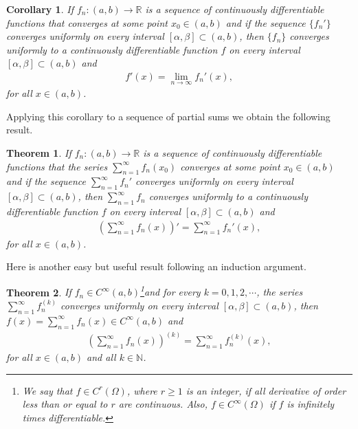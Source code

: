 \documentclass[10pt]{book}
\newtheorem{theorem}{Theorem}[chapter]
\newtheorem{corollary}{Corollary}[theorem]
\theoremstyle{definition}
\numberwithin{equation}{chapter}
\begin{document}
\medskip

\begin{corollary}
If $f_n: (a,b) \to \mathbb{R}$ is a sequence of continuously differentiable functions that converges at some point $x_0 \in (a,b)$ and if the sequence $\{f_n'\}$ converges uniformly on every interval $[\alpha,\beta] \subset (a,b)$, then $\{f_n\}$ converges uniformly to a continuously differentiable function $f$ on every interval $[\alpha,\beta] \subset (a,b)$ and
\begin{align*}
    f'(x) = \lim_{n\to\infty} f_n'(x),
\end{align*}
for all $x \in (a,b)$.
\end{corollary}

\medskip

Applying this corollary to a sequence of partial sums we obtain the following result.

\medskip

\begin{theorem}
If $f_n: (a,b) \to \mathbb{R}$ is a sequence of continuously differentiable functions that the series $\sum^\infty_{n=1} f_n(x_0)$ converges at some point $x_0 \in (a,b)$ and if the sequence $\sum^\infty_{n=1} f_n'$ converges uniformly on every interval $[\alpha,\beta] \subset (a,b)$, then $\sum^\infty_{n=1} f_n$ converges uniformly to a continuously differentiable function $f$ on every interval $[\alpha,\beta] \subset (a,b)$ and
\begin{align*}
    \left(\sum^\infty_{n=1} f_n(x)\right)' = \sum^\infty_{n=1} f_n'(x),
\end{align*}
for all $x \in (a,b)$.
\end{theorem}

\medskip

Here is another easy but useful result following an induction argument.

\medskip

\begin{theorem}\label{th_612}
If $f_n \in C^\infty(a,b)$\footnote{We say that $f \in C^r(\Omega)$, where $r \geq 1$ is an integer, if all derivative of order less than or equal to $r$ are continuous. Also, $f \in C^\infty(\Omega)$ if $f$ is infinitely times differentiable.}and for every $k = 0,1,2,\cdots$, the series $\sum^\infty_{n=1} f_n^{(k)}$ converges uniformly on every interval $[\alpha,\beta] \subset (a,b)$, then $f(x) = \sum^\infty_{n=1} f_n(x) \in C^\infty(a,b)$ and
\begin{align*}
    \left(\sum^\infty_{n=1} f_n(x)\right)^{(k)} = \sum^\infty_{n=1} f_n^{(k)}(x),
\end{align*}
for all $x \in (a,b)$ and all $k \in \mathbb{N}$.
\end{theorem}
\end{document}
